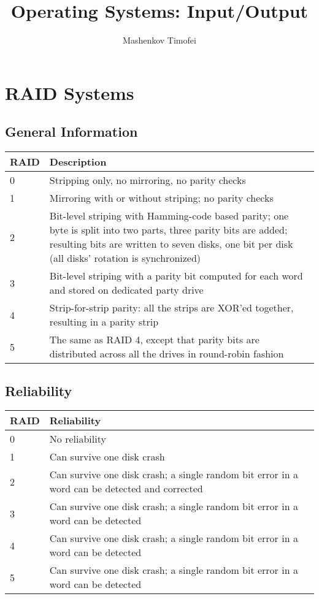 \documentclass{article}
\title{Operating Systems: Input/Output}
\author{Mashenkov Timofei}
\begin{document}
\maketitle{}

\section*{RAID Systems}

\subsection*{General Information}

\begin{fleqn}
  \begin{tabular}{| m{1cm} | m{12cm} |}
    \hline
    RAID & Description  \\ 
    \hline
    0 & Stripping only, no mirroring, no parity checks \\ 
    \hline
    1 & Mirroring with or without striping; no parity checks \\ 
    \hline
    2 & Bit-level striping with Hamming-code based parity; one byte is split into two parts, three parity bits are
    added; resulting bits are written to seven disks, one bit per disk (all disks' rotation is synchronized) \\
    \hline
    3 & Bit-level striping with a parity bit computed for each word and stored on dedicated party drive \\ 
    \hline
    4 & Strip-for-strip parity: all the strips are XOR'ed together, resulting in a parity strip \\ 
    \hline
    5 & The same as RAID 4, except that parity bits are distributed across all the drives in round-robin fashion \\
    \hline
  \end{tabular}
\end{fleqn}

\subsection*{Reliability}

\begin{fleqn}
  \begin{tabular}{| m{1cm} | m{12cm} |}
    \hline
    RAID & Reliability \\ 
    \hline
    0 & No reliability \\ 
    \hline
    1 & Can survive one disk crash \\ 
    \hline
    2 & Can survive one disk crash; a single random bit error in a word can be detected and corrected \\
    \hline
    3 & Can survive one disk crash; a single random bit error in a word can be detected \\ 
    \hline
    4 & Can survive one disk crash; a single random bit error in a word can be detected \\ 
    \hline
    5 & Can survive one disk crash; a single random bit error in a word can be detected \\
    \hline
  \end{tabular}
\end{fleqn}
\end{document}
